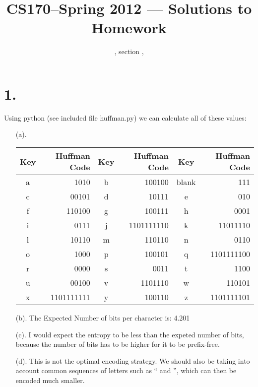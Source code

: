 \documentclass[11pt]{article}
\title{CS170--Spring 2012 --- Solutions to Homework \HW}
\author{\Name, section \Sec, \texttt{\Login}}
\begin{document}
\maketitle

\section*{1.}

Using python (see included file huffman.py) we can calculate all of these
values:
\begin{enumerate}
\item[(a).]
\begin{tabular}{cr|cr|cr}
Key&Huffman Code&Key&Huffman Code&Key&Huffman Code\\
\hline
a&1010 & b&100100 & blank&111 \\
c&00101 & d&10111 & e&010 \\
f&110100 & g&100111 & h&0001 \\
i&0111 & j&1101111110 & k&11011110 \\
l&10110 & m&110110 & n&0110 \\
o&1000 & p&100101 & q&1101111100 \\
r&0000 & s&0011 & t&1100 \\
u&00100 & v&1101110 & w&110101 \\
x&1101111111 & y&100110 & z&1101111101 \\
\end{tabular}

\item[(b).]
The Expected Number of bits per character is: 4.201

\item[(c).]
I would expect the entropy to be less than the expeted number of bits, because
the number of bits has to be higher for it to be prefix-free.

\item[(d).]
This is not the optimal encoding strategy. We should also be taking into account
common sequences of letters such as `` and '', which can then be encoded much
smaller.
\end{enumerate}

\newpage
\end{document}
